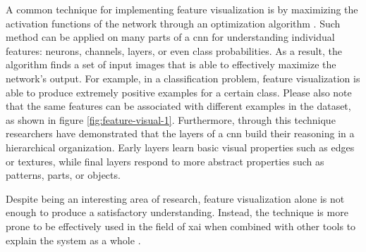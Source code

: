 A common technique for implementing feature visualization is by maximizing the activation functions of the network through an optimization algorithm \cite{erhan2009feature, nguyen2016multifaceted}. Such method can be applied on many parts of a \gls{cnn} for understanding individual features: neurons, channels, layers, or even class probabilities. As a result, the algorithm finds a set of input images that is able to effectively maximize the network's output. For example, in a classification problem, feature visualization is able to produce extremely positive examples for a certain class. Please also note that the same features can be associated with different examples in the dataset, as shown in figure \ref{fig:feature-visual-1}. Furthermore, through this technique researchers have demonstrated \cite{olah2017feature} that the layers of a \gls{cnn} build their reasoning in a hierarchical organization. Early layers learn basic visual properties such as edges or textures, while final layers respond to more abstract properties such as patterns, parts, or objects.

Despite being an interesting area of research, feature visualization alone is not enough to produce a satisfactory understanding. Instead, the technique is more prone to be effectively used in the field of \gls{xai} when combined with other tools to explain the system as a whole \cite{zurowietz2020intvis, olah2018the}.

